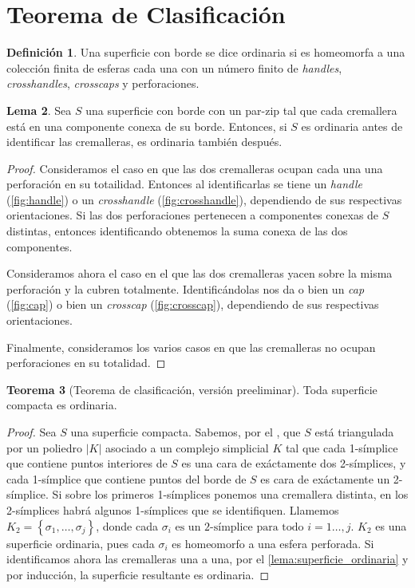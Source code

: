 \documentclass[10pt]{report}
\theoremstyle{definition}
\newtheorem{defin}{Definición}[section]
\newtheorem{tma}[defin]{Teorema}
\newtheorem{lema}[defin]{Lema}
\begin{document}
\section{Teorema de Clasificación}

\begin{defin}%
Una superficie con borde se dice ordinaria si es homeomorfa a una colección finita de esferas cada una con un número finito de \textit{handles}, \textit{crosshandles}, \textit{crosscaps} y perforaciones.
\end{defin}


\begin{lema}%
Sea $S$ una superficie con borde con un par-zip tal que cada cremallera está en una componente conexa de su borde. Entonces, si $S$ es ordinaria antes de identificar las cremalleras, es ordinaria también después.\label{lema:superficie_ordinaria}
\end{lema}
\begin{proof}
Consideramos el caso en que las dos cremalleras ocupan cada una una perforación en su totailidad. Entonces al identificarlas se tiene un \textit{handle} (\autoref{fig:handle}) o un \textit{crosshandle} (\autoref{fig:crosshandle}), dependiendo de sus respectivas orientaciones. Si las dos perforaciones pertenecen a componentes conexas de $S$ distintas, entonces identificando obtenemos la suma conexa de las dos componentes. 

Consideramos ahora el caso en el que las dos cremalleras yacen sobre la misma perforación y la cubren totalmente. Identificándolas nos da o bien un \textit{cap} (\autoref{fig:cap}) o bien un \textit{crosscap} (\autoref{fig:crosscap}), dependiendo de sus respectivas orientaciones.

Finalmente, consideramos los varios casos en que las cremalleras no ocupan perforaciones en su totalidad. 

\end{proof}

\begin{tma}[Teorema de clasificación, versión preeliminar] %
Toda superficie compacta es ordinaria.
\end{tma}
\begin{proof}
Sea $S$ una superficie compacta. Sabemos, por el , que $S$ está triangulada por un poliedro $|K|$ asociado a un complejo simplicial $K$ tal que cada 1-símplice que contiene puntos interiores de $S$ es una cara de exáctamente dos 2-símplices, y cada 1-símplice que contiene puntos del borde de $S$ es cara de exáctamente un 2-símplice. Si sobre los primeros 1-símplices ponemos una cremallera distinta, en los 2-símplices habrá algunos 1-símplices que se identifiquen. Llamemos $K_2=\left\{\sigma_1,\dots ,\sigma_j\right\}$, donde cada $\sigma_i \text{ es un 2-símplice para todo } i=1\dots ,j$. $K_2$ es una superficie ordinaria, pues cada $\sigma_i$ es homeomorfo a una esfera perforada. Si identificamos ahora las cremalleras una a una, por el \autoref{lema:superficie_ordinaria} y por inducción, la superficie resultante es ordinaria.
\end{proof}
\end{document}
